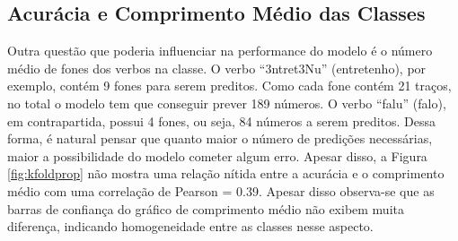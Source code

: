 







\subsection{Acurácia e Comprimento Médio das Classes}

Outra questão que poderia influenciar na performance do modelo é o número médio de fones dos verbos na classe.  O verbo “3ntret3Nu” (entretenho), por exemplo, contém 9 fones para serem preditos. Como cada fone contém 21 traços, no total o modelo tem que conseguir prever 189 números. O verbo “falu” (falo), em contrapartida, possui 4 fones, ou seja, 84 números a serem preditos. Dessa forma, é natural pensar que quanto maior o número de predições necessárias, maior a possibilidade do modelo cometer algum erro. Apesar disso, a Figura \ref{fig:kfoldprop} não mostra uma relação nítida entre a acurácia e o comprimento médio com uma correlação de Pearson = 0.39. Apesar disso observa-se que as barras de confiança do gráfico de comprimento médio não exibem muita diferença, indicando homogeneidade entre as classes nesse aspecto.

